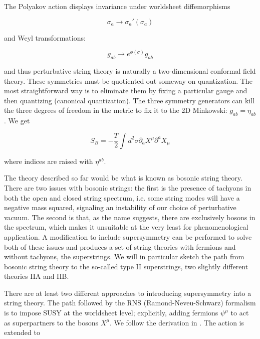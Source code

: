 The Polyakov action displays invariance under worldsheet diffemorphisms 

\begin{equation}
	\sigma_a \rightarrow \sigma_a'(\sigma_a)
	\label{}
\end{equation}

and Weyl transformations:

\begin{equation}
	g_{ab} \rightarrow e^{\phi(\sigma)} g_{ab} 
	\label{}
\end{equation}

and thus perturbative string theory is naturally a two-dimensional conformal field theory. These symmetries must be quotiented out someway on quantization. The most straightforward way is to eliminate them by fixing a particular gauge and then quantizing (canonical quantization). The three symmetry generators can kill the three degrees of freedom in the metric to fix it to the 2D Minkowski: $g_{ab} = \eta_{ab}$. We get

\begin{equation}
S_B = - \frac{T}{2} \int d^2\sigma \partial_a X^\mu \partial^a X_\mu
\end{equation}

where indices are raised with $\eta^{ab}$.

The theory described so far would be what is known as bosonic string theory. There are two issues with bosonic strings: the first is the presence of tachyons in both the open and closed string spectrum, i.e. some string modes will have a negative mass squared, signaling an instability of our choice of perturbative vacuum. The second is that, as the name suggests, there are exclusively bosons in the spectrum, which makes it unsuitable at the very least for phenomenological application. A modification to include supersymmetry can be performed to solve both of these issues and produces a set of string theories with fermions and without tachyons, the superstrings. We will in particular sketch the path from bosonic string theory to the so-called type II superstrings, two slightly different theories IIA and IIB.

There are at least two different approaches to introducing supersymmetry into a string theory. The path followed by the RNS (Ramond-Neveu-Schwarz) formalism is to impose SUSY at the worldsheet level; explicitly, adding fermions $\psi^\mu$ to act as superpartners to the bosons $X^\mu$. We follow the derivation in \cite{BBS}. The action is extended to


